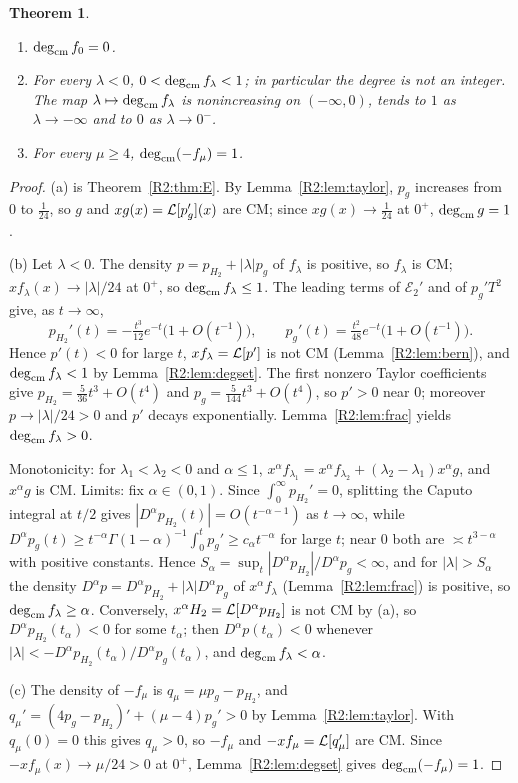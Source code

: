 \documentclass[11pt]{amsart}
\newtheorem{theorem}{Theorem}[section]
\theoremstyle{definition}
\theoremstyle{remark}
\begin{document}
\begin{theorem}\label{R2:thm:F}
\begin{enumerate}
\item[(a)] $\operatorname{deg}_{\mathrm{cm}} f_0=0$.
\item[(b)] For every $\lambda<0$, $0<\operatorname{deg}_{\mathrm{cm}} f_\lambda<1$; in particular
 the degree is not an integer. The map $\lambda\mapsto\operatorname{deg}_{\mathrm{cm}} f_\lambda$ is
 nonincreasing on $(-\infty,0)$, tends to $1$ as $\lambda\to-\infty$ and to
 $0$ as $\lambda\to0^-$.
\item[(c)] For every $\mu\ge4$, $\operatorname{deg}_{\mathrm{cm}}(-f_\mu)=1$.
\end{enumerate}
\end{theorem}
\begin{proof}
(a) is Theorem~\ref{R2:thm:E}. By Lemma~\ref{R2:lem:taylor}, $p_g$ increases
from $0$ to $\frac1{24}$, so $g$ and $xg(x)=\mathcal{L}[p_g'](x)$ are CM; since
$xg(x)\to\frac1{24}$ at $0^+$, $\operatorname{deg}_{\mathrm{cm}} g=1$.

(b) Let $\lambda<0$. The density $p=p_{H_2}+|\lambda|p_g$ of $f_\lambda$ is
positive, so $f_\lambda$ is CM; $xf_\lambda(x)\to|\lambda|/24$ at $0^+$, so
$\operatorname{deg}_{\mathrm{cm}} f_\lambda\le1$. The leading terms of $\mathcal E_2'$ and of
$p_g'T^2$ give, as $t\to\infty$,
\[
 p_{H_2}'(t)=-\tfrac{t^3}{12}e^{-t}\bigl(1+O(t^{-1})\bigr),\qquad
 p_g'(t)=\tfrac{t^2}{48}e^{-t}\bigl(1+O(t^{-1})\bigr).
\]
Hence $p'(t)<0$ for large $t$, $xf_\lambda=\mathcal{L}[p']$ is not CM
(Lemma~\ref{R2:lem:bern}), and $\operatorname{deg}_{\mathrm{cm}} f_\lambda<1$ by
Lemma~\ref{R2:lem:degset}. The first nonzero Taylor coefficients give
$p_{H_2}=\frac5{36}t^3+O(t^4)$ and $p_g=\frac5{144}t^3+O(t^4)$, so $p'>0$ near
$0$; moreover $p\to|\lambda|/24>0$ and $p'$ decays exponentially.
Lemma~\ref{R2:lem:frac} yields $\operatorname{deg}_{\mathrm{cm}} f_\lambda>0$.

Monotonicity: for $\lambda_1<\lambda_2<0$ and $\alpha\le1$,
$x^\alpha f_{\lambda_1}=x^\alpha f_{\lambda_2}+(\lambda_2-\lambda_1)x^\alpha g$,
and $x^\alpha g$ is CM. Limits: fix $\alpha\in(0,1)$. Since
$\int_0^\infty p_{H_2}'=0$, splitting the Caputo integral at $t/2$ gives
$|D^\alpha p_{H_2}(t)|=O(t^{-\alpha-1})$ as $t\to\infty$, while
$D^\alpha p_g(t)\ge t^{-\alpha}\Gamma(1-\alpha)^{-1}\int_0^tp_g'\ge c_\alpha t^{-\alpha}$
for large $t$; near $0$ both are $\asymp t^{3-\alpha}$ with positive
constants. Hence $S_\alpha=\sup_t|D^\alpha p_{H_2}|/D^\alpha p_g<\infty$,
and for $|\lambda|>S_\alpha$ the density
$D^\alpha p=D^\alpha p_{H_2}+|\lambda|D^\alpha p_g$ of $x^\alpha f_\lambda$
(Lemma~\ref{R2:lem:frac}) is positive, so $\operatorname{deg}_{\mathrm{cm}} f_\lambda\ge\alpha$.
Conversely, $x^\alpha H_2=\mathcal{L}[D^\alpha p_{H_2}]$ is not CM by (a), so
$D^\alpha p_{H_2}(t_\alpha)<0$ for some $t_\alpha$; then
$D^\alpha p(t_\alpha)<0$ whenever
$|\lambda|<-D^\alpha p_{H_2}(t_\alpha)/D^\alpha p_g(t_\alpha)$, and
$\operatorname{deg}_{\mathrm{cm}} f_\lambda<\alpha$.

(c) The density of $-f_\mu$ is $q_\mu=\mu p_g-p_{H_2}$, and
$q_\mu'=(4p_g-p_{H_2})'+(\mu-4)p_g'>0$ by Lemma~\ref{R2:lem:taylor}. With
$q_\mu(0)=0$ this gives $q_\mu>0$, so $-f_\mu$ and
$-xf_\mu=\mathcal{L}[q_\mu']$ are CM. Since $-xf_\mu(x)\to\mu/24>0$ at $0^+$,
Lemma~\ref{R2:lem:degset} gives $\operatorname{deg}_{\mathrm{cm}}(-f_\mu)=1$.
\end{proof}
\end{document}
